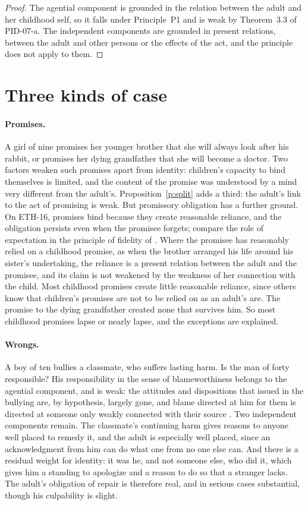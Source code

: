 \documentclass{situationist-preprint}
\begin{document}
\begin{proof}
The agential component is grounded in the relation between the adult and her childhood self, so it falls under Principle~P1 and is weak by Theorem~3.3 of PID-07-a. The independent components are grounded in present relations, between the adult and other persons or the effects of the act, and the principle does not apply to them.
\end{proof}

\section{Three kinds of case}

\paragraph{Promises.} A girl of nine promises her younger brother that she will always look after his rabbit, or promises her dying grandfather that she will become a doctor. Two factors weaken such promises apart from identity: children's capacity to bind themselves is limited, and the content of the promise was understood by a mind very different from the adult's. Proposition~\ref{p:split} adds a third: the adult's link to the act of promising is weak. But promissory obligation has a further ground. On ETH-16, promises bind because they create reasonable reliance, and the obligation persists even when the promisee forgets; compare the role of expectation in the principle of fidelity of \citet[ch.~7]{Scanlon1998}. Where the promisee has reasonably relied on a childhood promise, as when the brother arranged his life around his sister's undertaking, the reliance is a present relation between the adult and the promisee, and its claim is not weakened by the weakness of her connection with the child. Most childhood promises create little reasonable reliance, since others know that children's promises are not to be relied on as an adult's are. The promise to the dying grandfather created none that survives him. So most childhood promises lapse or nearly lapse, and the exceptions are explained.

\paragraph{Wrongs.} A boy of ten bullies a classmate, who suffers lasting harm. Is the man of forty responsible? His responsibility in the sense of blameworthiness belongs to the agential component, and is weak: the attitudes and dispositions that issued in the bullying are, by hypothesis, largely gone, and blame directed at him for them is directed at someone only weakly connected with their source \citep[ch.~15]{Parfit1984}. Two independent components remain. The classmate's continuing harm gives reasons to anyone well placed to remedy it, and the adult is especially well placed, since an acknowledgment from him can do what one from no one else can. And there is a residual weight for identity: it was he, and not someone else, who did it, which gives him a standing to apologize and a reason to do so that a stranger lacks. The adult's obligation of repair is therefore real, and in serious cases substantial, though his culpability is slight.
\end{document}

